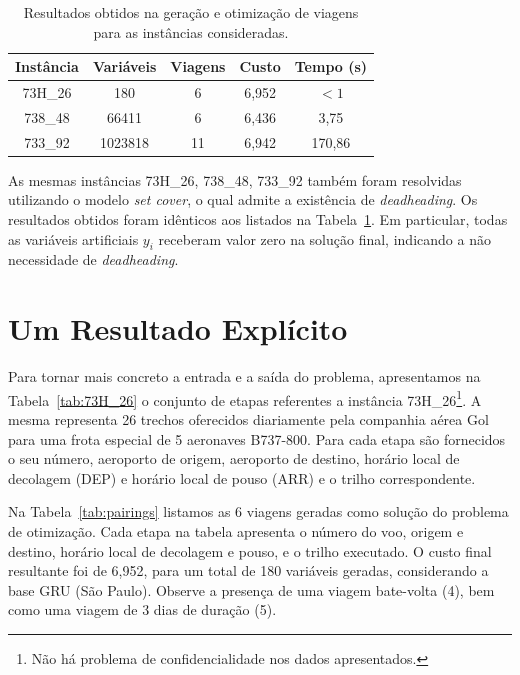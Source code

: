 \begin{table}[htb]
	\begin{center} 
		\begin{tabular}{|c|c|c|c|c|}
			\hline 
			{\bf Instância} & {\bf Variáveis} & {\bf Viagens} & {\bf Custo} & {\bf Tempo (s)} \\ 
			\hline \hline
			73H\_26 & 180 & 6 & 6,952 & $< 1$ \\ 
			738\_48 & 66411 & 6 & 6,436 & 3,75 \\
			733\_92 & 1023818 & 11 & 6,942 & 170,86 \\ \hline
		\end{tabular}
		\caption{Resultados obtidos na geração e otimização de viagens para as instâncias consideradas.}
		\label{tab:resultados}
	\end{center}
\end{table}

As mesmas instâncias 73H\_26, 738\_48, 733\_92 também foram resolvidas utilizando o modelo 
{\it set cover}, o qual admite a existência de {\it deadheading}. Os resultados obtidos foram 
idênticos aos listados na Tabela~\ref{tab:resultados}. Em particular, todas as variáveis 
artificiais $y_i$ receberam valor zero na solução final, indicando a não necessidade de 
{\it deadheading}.


\section{Um Resultado Explícito}
\label{sec:resultado_explicito}

Para tornar mais concreto a entrada e a saída do problema, apresentamos na Tabela~\ref{tab:73H_26} o
conjunto de etapas referentes a instância 73H\_26\footnote{Não há problema de confidencialidade nos
dados apresentados.}. A mesma representa 26 trechos oferecidos diariamente pela companhia aérea Gol
para uma frota especial de 5 aeronaves B737-800. Para cada etapa são fornecidos o seu número,
aeroporto de origem, aeroporto de destino, horário local de decolagem (DEP) e horário local de pouso
(ARR) e o trilho correspondente.

Na Tabela~\ref{tab:pairings} listamos as 6 viagens geradas como solução do problema de otimização.
Cada etapa na tabela apresenta o número do voo, origem e destino, horário local de decolagem e 
pouso, e o trilho executado. O custo final resultante foi de 6,952, para um total de 180 variáveis 
geradas, considerando a base GRU (São Paulo). Observe a presença de uma viagem bate-volta (4),
bem como uma viagem de 3 dias de duração (5).

